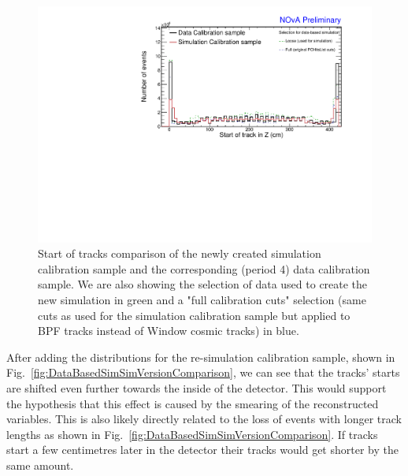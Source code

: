 \begin{figure}[!ht]
\includegraphics[clip, width=\textwidth]{Plots/TBCalibration/DBSim_DataMCComparison_StartZ.pdf}
\caption[Data-Simulation comparison of track start distribution]{Start of tracks comparison of the newly created simulation calibration sample and the corresponding (period 4) data calibration sample. We are also showing the selection of data used to create the new simulation in green and a "full calibration cuts" selection (same cuts as used for the simulation calibration sample but applied to \acrshort{BPF} tracks instead of Window cosmic tracks) in blue.}
\label{fig:DataBasedSimDataMCComparison_startZ}
\end{figure}

After adding the distributions for the re-simulation calibration sample, shown in Fig.~\ref{fig:DataBasedSimSimVersionComparison}, we can see that the tracks' starts are shifted even further towards the inside of the detector. This would support the hypothesis that this effect is caused by the smearing of the reconstructed variables. This is also likely directly related to the loss of events with longer track lengths as shown in Fig.~\ref{fig:DataBasedSimSimVersionComparison}. If tracks start a few centimetres later in the detector their tracks would get shorter by the same amount.

